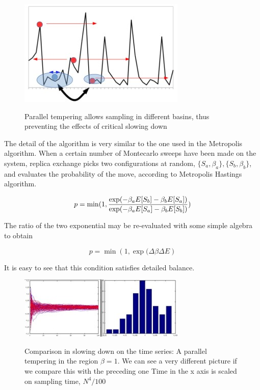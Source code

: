 \documentclass{article}
\begin{document}
\begin{figure}[h]
		\includegraphics{imgtemper3.jpg}
	\label{fig:imgtempering}
	\caption{Parallel tempering allows sampling in different basins, thus preventing the effects of critical slowing down}
\end{figure}

The detail of the algorithm is very similar to the one used in the Metropolis algorithm. When a certain number of Montecarlo sweeps have been made on the system, replica exchange picks two configurations at random, $\{S_a,\beta_a\},\{S_b,\beta_b\}$, and evaluates the probability of the move, according to Metropolis Hastings algorithm. 

\begin{equation}
p = \min ( 1, { \exp( -\beta_a E[S_b] - \beta_b E[S_a]) \over \exp( -\beta_a E[S_a] - \beta_b E[S_b])   } )
\end{equation}

The ratio of the two exponential may be re-evaluated with some simple algebra to obtain

\begin{equation}
p = \min ( 1, { \exp(  \Delta \beta \Delta E   } ) 
\end{equation}

It is easy to see that this condition satisfies detailed balance.

\begin{figure}[h]
		\includegraphics{temp2.jpg}
		\label{fig:img_e}
	\caption{Comparison in slowing down on the time series: A parallel tempering in the region $\beta = 1$. We can see a very different picture if we compare this with the preceding one
	Time in the x axis is scaled on sampling time,  $N^4 / 100$}
\end{figure}
\end{document}
